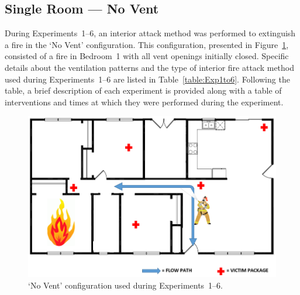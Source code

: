 \documentclass[12pt,oneside]{book}
\begin{document}
\subsection{Single Room --- No Vent}

During Experiments~1--6, an interior attack method was performed to extinguish a fire in the `No Vent' configuration. This configuration, presented in Figure~\ref{fig:No_Vent_int}, consisted of a fire in Bedroom~1 with all vent openings initially closed. Specific details about the ventilation patterns and the type of interior fire attack method used during Experiments~1--6 are listed in Table~\ref{table:Exp1to6}. Following the table, a brief description of each experiment is provided along with a table of interventions and times at which they were performed during the experiment.  

\begin{figure}[!ht]
	\centering
	\includegraphics[width=5in]{Figures/General/No_Vent_interior_config}
	\caption{`No Vent' configuration used during Experiments~1--6.}
	\label{fig:No_Vent_int}
\end{figure}
\end{document}
